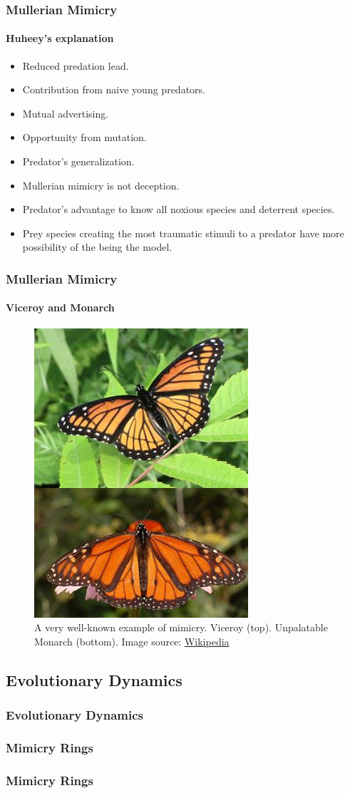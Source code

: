 \frame
{
	\frametitle{Mullerian Mimicry}
	\framesubtitle{Huheey's explanation}
	
	\begin{itemize}
		\item Reduced predation lead.
		\item Contribution from naive young predators.
		\item Mutual advertising.
		\item Opportunity from mutation.
		\item Predator's generalization.
	\end{itemize}
	
	\begin{itemize}
		\item Mullerian mimicry is not deception.
		\item Predator's advantage to know all noxious species and deterrent species.
		\item Prey species creating the most traumatic stimuli to a predator have more possibility of the being the model.
	\end{itemize}
}

\frame
{
	\frametitle{Mullerian Mimicry}
	\framesubtitle{Viceroy and Monarch}

	\begin{figure}[H]
		\centering
		\includegraphics[scale=0.5]{../tex/images/BatesMimButter}
		\caption{A very well-known example of mimicry. Viceroy (top). Unpalatable Monarch (bottom). Image source: \href{http://en.wikipedia.org/wiki/Mullerian_mimicry}{Wikipedia}}
		\label{fig:mullerian-butterfly}
	\end{figure}

}

\subsection{Evolutionary Dynamics}

\frame
{
	\frametitle{Evolutionary Dynamics}
}

\subsubsection{Mimicry Rings}

\frame
{
	\frametitle{Mimicry Rings}
}